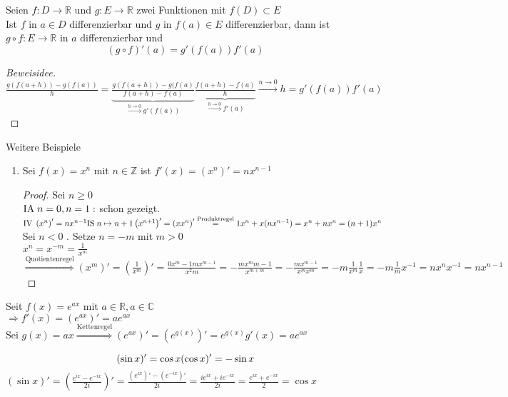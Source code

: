 \documentclass[a4paper,titlepage,oneside]{article}
\def\C{\ensuremath{\mathbb{C}} }
\def\Z{\ensuremath{\mathbb{Z}} }
\def\R{\ensuremath{\mathbb{R}} }
\def\im{\ensuremath{\mathit{i}} }
\def\e{\ensuremath{\mathit{e}} }
\newcommand{\IA}[1][n=0]{\vspace{0.1pt}\ensuremath{\text{IA}\sp#1:}}
\newcommand{\IV}{\vspace{0.1pt}\ensuremath{\text{IV}\sp}}
\newcommand{\IS}[1][n \mapsto n+1]{\vspace{0.1pt}\ensuremath{\text{IS}\sp#1}}
\def\sp{\hspace{0,1cm}}
\newcommand{\longtonull}[1][n]{\ensuremath{\overset{\scriptscriptstyle{#1 \to 0}}{\longrightarrow}}}
\theoremstyle{thmstyle}
\begin{document}
\begin{satz}[Kettenregel]
Seien $f: D \to \R$ und $g : E \to \R$ zwei Funktionen mit $f(D) \subset E$\\
Ist $f$ in $a \in D$ differenzierbar und $g$ in $f(a) \in E$ differenzierbar, dann ist $g \circ f : E \to \R $ in $a$ differenzierbar und \[ \left(g \circ f\right)'(a) = g'(f(a)) f'(a)\]
\begin{proof}[Beweisidee]
$\frac{g(f(a+h)) - g(f(a))}{h} = \underbrace{\frac{g(f(a+h)) - g(f(a)}{f(a+h)-f(a)}}_{\longtonull[h] g'(f(a))} \underbrace{\frac{f(a+h) - f(a)}{h}}_{\longtonull[h] f'(a)} \longtonull{h} = g'(f(a))f'(a)$
\end{proof}
\end{satz}

\begin{bsp} Weitere Beispiele
\begin{enumerate}
\item Sei $f(x) = x^n$ mit $n \in \Z$ ist $f'(x) = \left(x^n\right)' = n x^{n-1}$
\begin{proof} Sei $n \ge 0$ \\
$\IA[n=0, n=1] $ schon gezeigt.\\
$\IV \left(x^n\right)' = n x^{n-1}\\
\IS \\
\left(x^{n+1}\right)' = \left(x x^n\right)' \overset{\text{Produktregel}}{=} 1 x^n + x (n x^{n-1}) = x^n + n x^n = (n+1) x^n$\\
Sei $n < 0$ . Setze $n = -m$ mit $m > 0$\\
$x^n = x^{-m} = \frac{1}{x^m}$
$\overset{\text{Quotientenregel}}{\Rightarrow} \left(x^m\right)' = \left(\frac{1}{x^m}\right)' = \frac{0 x^m - 1 m x^{m-1}}{x^2m} = - \frac{m x^m{m-1}}{x^{m+m}} = - \frac{mx^{m-1}}{x^mx^m} = -m \frac{1}{x^m}\frac{1}{x} = - m \frac{1}{m} x^{-1} = n x^n x^{-1} = n x^{n-1}$
\end{proof}
\end{enumerate}
\item Seit $f(x) = \e^{ax}$ mit $a \in \R , a \in \C$\\
$\Rightarrow f'(x) = (\e^{ax})' = a \e^{ax}$\\
Sei $g(x) = ax \overset{\text{Kettenregel}}{\Rightarrow}  (\e^{ax})' =  (\e^{g(x)})' =  \e^{g(x)}g'(x) =  a \e^{ax}$
\item \[(\sin x)' = \cos x \\ (\cos x)' = - \sin x\]
$\displaystyle (\sin x)' = \left( \frac{\e^{\im x} - \e^{-\im x}}{2\im}\right)' = \frac{(\e^{\im x})' - (\e^{-\im x})'}{2\im} = \frac{\im \e^{\im x} + \im \e^{-\im x}}{2\im} = \frac{\e^{\im x} + \e^{-\im x}}{2} = \cos x $\\

\end{bsp}
\end{document}
